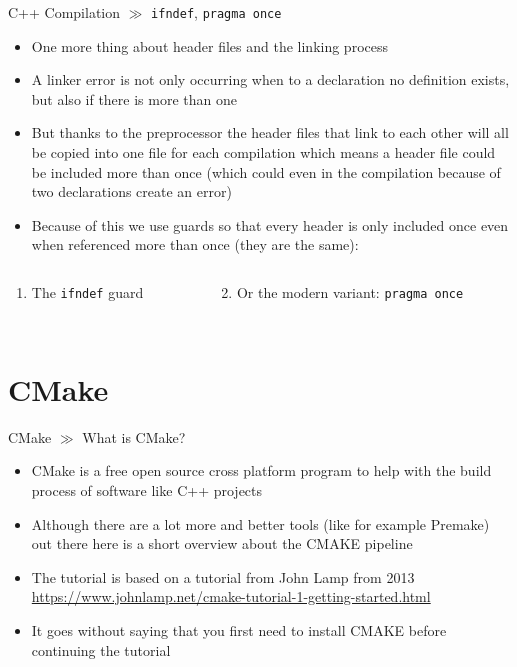 \documentclass[10pt]{beamer}
\begin{document}
\begin{frame}{C++ Compilation $\gg$ \texttt{ifndef}, \texttt{pragma once}}
\begin{itemize}
	\item One more thing about header files and the linking process
	\item A linker error is not only occurring when to a declaration no definition exists, but also if there is more than one
	\item But thanks to the preprocessor the header files that link to each other will all be copied into one file for each compilation which means a header file could be included more than once (which could even in the compilation because of two declarations create an error)
	\item Because of this we use guards so that every header is only included once even when referenced more than once (they are the same):
\end{itemize}
\begin{columns}
	\begin{column}{0.5\textwidth}
		\begin{enumerate}
			\item The \texttt{ifndef} guard
			\inputminted[bgcolor=lightGreyCustom,fontsize=\scriptsize]{cpp}{./resources/ifndef_example.h}
		\end{enumerate}
	\end{column}
	\begin{column}{0.5\textwidth}
		\begin{enumerate}\setcounter{enumi}{1}
			\item Or the modern variant: \texttt{pragma once}
			\inputminted[bgcolor=lightGreyCustom,fontsize=\scriptsize]{cpp}{./resources/pragma_once_example.h}
		\end{enumerate}
	\end{column}
\end{columns}
\end{frame}

\section{CMake}

\begin{frame}{CMake $\gg$ What is CMake?}
\begin{itemize}
	\item CMake is a free open source cross platform program to help with the build process of software like C++ projects
	\item Although there are a lot more and better tools (like for example Premake) out there here is a short overview about the CMAKE pipeline
	\item The tutorial is based on a tutorial from John Lamp from 2013 \url{https://www.johnlamp.net/cmake-tutorial-1-getting-started.html}
	\item It goes without saying that you first need to install CMAKE before continuing the tutorial
\end{itemize}
\end{frame}
\end{document}
